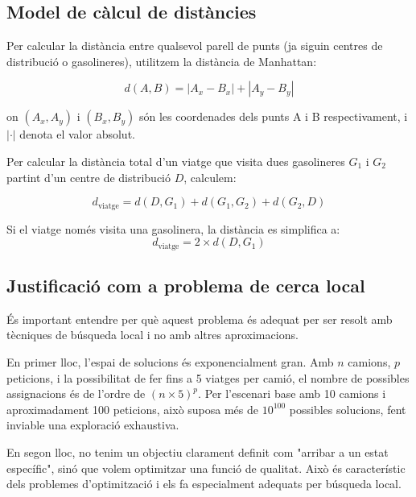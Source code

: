 \subsection{Model de càlcul de distàncies}

Per calcular la distància entre qualsevol parell de punts (ja siguin centres de distribució o gasolineres), utilitzem la distància de Manhattan:

\begin{equation}
d(A, B) = |A_x - B_x| + |A_y - B_y|
\label{eq:distance}
\end{equation}

on $(A_x, A_y)$ i $(B_x, B_y)$ són les coordenades dels punts A i B respectivament, i $|\cdot|$ denota el valor absolut.

Per calcular la distància total d'un viatge que visita dues gasolineres $G_1$ i $G_2$ partint d'un centre de distribució $D$, calculem:

\begin{equation}
d_{\text{viatge}} = d(D, G_1) + d(G_1, G_2) + d(G_2, D)
\label{eq:distance-viatge}
\end{equation}

Si el viatge només visita una gasolinera, la distància es simplifica a:
\begin{equation}
d_{\text{viatge}} = 2 \times d(D, G_1)
\label{eq:distance-viatge-simple}
\end{equation}

\subsection{Justificació com a problema de cerca local}

És important entendre per què aquest problema és adequat per ser resolt amb tècniques de búsqueda local i no amb altres aproximacions.

En primer lloc, l'espai de solucions és exponencialment gran. Amb $n$ camions, $p$ peticions, i la possibilitat de fer fins a 5 viatges per camió, el nombre de possibles assignacions és de l'ordre de $(n \times 5)^p$. Per l'escenari base amb 10 camions i aproximadament 100 peticions, això suposa més de $10^{100}$ possibles solucions, fent inviable una exploració exhaustiva.

En segon lloc, no tenim un objectiu clarament definit com "arribar a un estat específic", sinó que volem optimitzar una funció de qualitat. Això és característic dels problemes d'optimització i els fa especialment adequats per búsqueda local.


